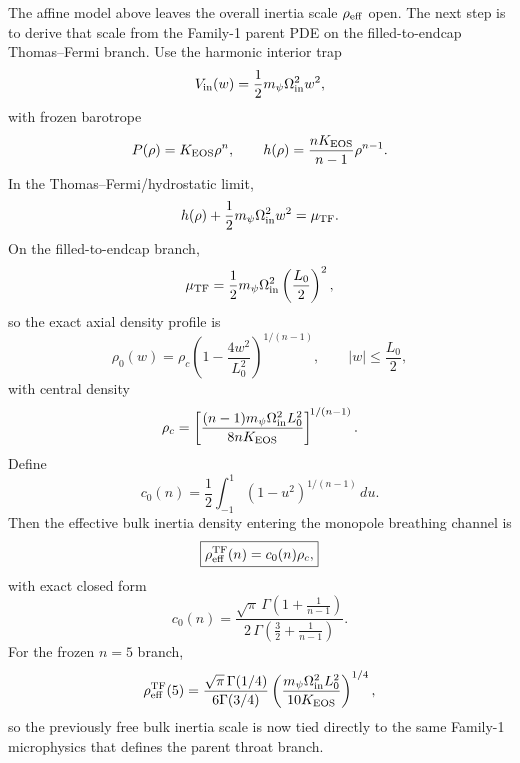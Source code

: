 \documentclass[11pt]{article}
\begin{document}
The affine model above leaves the overall inertia scale \(\rho_{\rm eff}\) open.
The next step is to derive that scale from the Family-1 parent PDE on the filled-to-endcap
Thomas--Fermi branch.
Use the harmonic interior trap
\begin{equation}
V_{\rm in}(w)=\frac12 m_\psi\Omega_{\rm in}^2 w^2,
\label{eq:geom-breathing-Vin}
\end{equation}
with frozen barotrope
\begin{equation}
P(\rho)=K_{\rm EOS}\rho^n,
\qquad
h(\rho)=\frac{nK_{\rm EOS}}{n-1}\rho^{n-1}.
\label{eq:geom-breathing-eos}
\end{equation}
In the Thomas--Fermi/hydrostatic limit,
\begin{equation}
h(\rho)+\frac12m_\psi\Omega_{\rm in}^2 w^2=\mu_{\rm TF}.
\label{eq:geom-breathing-TF-balance}
\end{equation}
On the filled-to-endcap branch,
\begin{equation}
\mu_{\rm TF}=\frac12m_\psi\Omega_{\rm in}^2\left(\frac{L_0}{2}\right)^2,
\label{eq:geom-breathing-muTF}
\end{equation}
so the exact axial density profile is
\begin{equation}
\rho_0(w)=\rho_c\left(1-\frac{4w^2}{L_0^2}\right)^{\!1/(n-1)},
\qquad
|w|\le \frac{L_0}{2},
\label{eq:geom-breathing-rho0w}
\end{equation}
with central density
\begin{equation}
\rho_c=
\left[
\frac{(n-1)m_\psi\Omega_{\rm in}^2L_0^2}{8nK_{\rm EOS}}
\right]^{\!1/(n-1)}.
\label{eq:geom-breathing-rhoc}
\end{equation}
Define
\begin{equation}
c_0(n)=\frac12\int_{-1}^{1}(1-u^2)^{1/(n-1)}\,du.
\label{eq:geom-breathing-c0n-def}
\end{equation}
Then the effective bulk inertia density entering the monopole breathing channel is
\begin{equation}
\boxed{
\rho_{\rm eff}^{\rm TF}(n)=c_0(n)\rho_c,
}
\label{eq:geom-breathing-rhoeffTFn}
\end{equation}
with exact closed form
\begin{equation}
\boxed{
c_0(n)=
\frac{\sqrt\pi\,\Gamma\!\left(1+\frac{1}{n-1}\right)}
{2\,\Gamma\!\left(\frac32+\frac{1}{n-1}\right)}.
}
\label{eq:geom-breathing-c0n}
\end{equation}
For the frozen \(n=5\) branch,
\begin{equation}
\rho_{\rm eff}^{\rm TF}(5)=
\frac{\sqrt\pi\,\Gamma(1/4)}{6\Gamma(3/4)}
\left(
\frac{m_\psi\Omega_{\rm in}^2L_0^2}{10K_{\rm EOS}}
\right)^{1/4},
\label{eq:geom-breathing-rhoeffTF5}
\end{equation}
so the previously free bulk inertia scale is now tied directly to the same Family-1
microphysics that defines the parent throat branch.
\end{document}
